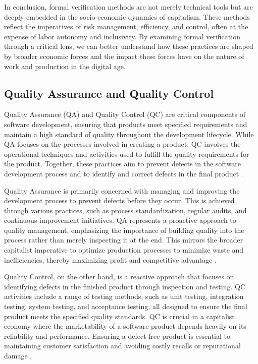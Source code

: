 \begin{refsection}
In conclusion, formal verification methods are not merely technical tools but are deeply embedded in the socio-economic dynamics of capitalism. These methods reflect the imperatives of risk management, efficiency, and control, often at the expense of labor autonomy and inclusivity. By examining formal verification through a critical lens, we can better understand how these practices are shaped by broader economic forces and the impact these forces have on the nature of work and production in the digital age.

\subsection{Quality Assurance and Quality Control}

Quality Assurance (QA) and Quality Control (QC) are critical components of software development, ensuring that products meet specified requirements and maintain a high standard of quality throughout the development lifecycle. While QA focuses on the processes involved in creating a product, QC involves the operational techniques and activities used to fulfill the quality requirements for the product. Together, these practices aim to prevent defects in the software development process and to identify and correct defects in the final product \cite[pp.~45-50]{juran1988quality}.

Quality Assurance is primarily concerned with managing and improving the development process to prevent defects before they occur. This is achieved through various practices, such as process standardization, regular audits, and continuous improvement initiatives. QA represents a proactive approach to quality management, emphasizing the importance of building quality into the process rather than merely inspecting it at the end. This mirrors the broader capitalist imperative to optimize production processes to minimize waste and inefficiencies, thereby maximizing profit and competitive advantage \cite[pp.~300-305]{crosby1979quality}.

Quality Control, on the other hand, is a reactive approach that focuses on identifying defects in the finished product through inspection and testing. QC activities include a range of testing methods, such as unit testing, integration testing, system testing, and acceptance testing, all designed to ensure the final product meets the specified quality standards. QC is crucial in a capitalist economy where the marketability of a software product depends heavily on its reliability and performance. Ensuring a defect-free product is essential to maintaining customer satisfaction and avoiding costly recalls or reputational damage \cite[pp.~210-215]{deming1986out}.


\end{refsection}

